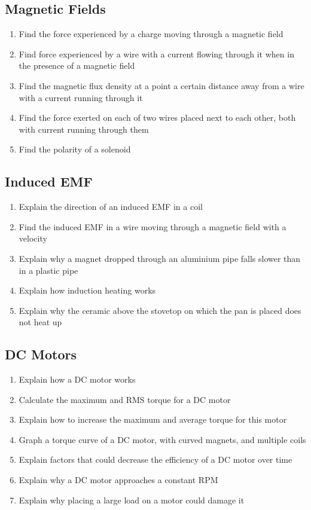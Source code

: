 \documentclass[a4paper,11pt]{article}
\begin{document}
\subsection{Magnetic Fields}

\begin{enumerate}
\item Find the force experienced by a charge moving through a magnetic field
\item Find force experienced by a wire with a current flowing through it when
	in the presence of a magnetic field
\item Find the magnetic flux density at a point a certain distance away from a
	wire with a current running through it
\item Find the force exerted on each of two wires placed next to each other,
	both with current running through them
\item Find the polarity of a solenoid
\end{enumerate}


\subsection{Induced EMF}

\begin{enumerate}
\item Explain the direction of an induced EMF in a coil
\item Find the induced EMF in a wire moving through a magnetic field with a
	velocity
\item Explain why a magnet dropped through an aluminium pipe falls slower than
	in a plastic pipe
\item Explain how induction heating works
\item Explain why the ceramic above the stovetop on which the pan is placed
	does not heat up
\end{enumerate}


\subsection{DC Motors}

\begin{enumerate}
\item Explain how a DC motor works
\item Calculate the maximum and RMS torque for a DC motor
\item Explain how to increase the maximum and average torque for this motor
\item Graph a torque curve of a DC motor, with curved magnets, and multiple
	coils
\item Explain factors that could decrease the efficiency of a DC motor over
	time
\item Explain why a DC motor approaches a constant RPM
\item Explain why placing a large load on a motor could damage it
\end{enumerate}
\end{document}
